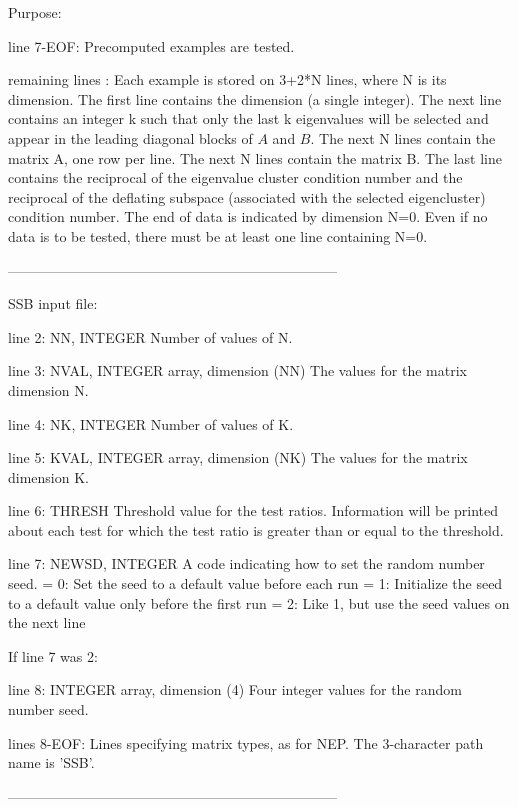 \begin{DoxyParagraph}{Purpose\+: }
\begin{DoxyVerb}
 line 7-EOF: Precomputed examples are tested.

 remaining lines : Each example is stored on 3+2*N lines, where N is
          its dimension. The first line contains the dimension (a
          single integer).  The next line contains an integer k such
          that only the last k eigenvalues will be selected and appear
          in the leading diagonal blocks of $A$ and $B$. The next N
          lines contain the matrix A, one row per line.  The next N
          lines contain the matrix B.  The last line contains the
          reciprocal of the eigenvalue cluster condition number and the
          reciprocal of the deflating subspace (associated with the
          selected eigencluster) condition number.  The end of data is
          indicated by dimension N=0.  Even if no data is to be tested,
          there must be at least one line containing N=0.

-----------------------------------------------------------------------

 SSB input file:

 line 2:  NN, INTEGER
          Number of values of N.

 line 3:  NVAL, INTEGER array, dimension (NN)
          The values for the matrix dimension N.

 line 4:  NK, INTEGER
          Number of values of K.

 line 5:  KVAL, INTEGER array, dimension (NK)
          The values for the matrix dimension K.

 line 6:  THRESH
          Threshold value for the test ratios.  Information will be
          printed about each test for which the test ratio is greater
          than or equal to the threshold.

 line 7:  NEWSD, INTEGER
          A code indicating how to set the random number seed.
          = 0:  Set the seed to a default value before each run
          = 1:  Initialize the seed to a default value only before the
                first run
          = 2:  Like 1, but use the seed values on the next line

 If line 7 was 2:

 line 8:  INTEGER array, dimension (4)
          Four integer values for the random number seed.

 lines 8-EOF:  Lines specifying matrix types, as for NEP.
          The 3-character path name is 'SSB'.

-----------------------------------------------------------------------


\end{DoxyVerb}
\end{DoxyParagraph}
